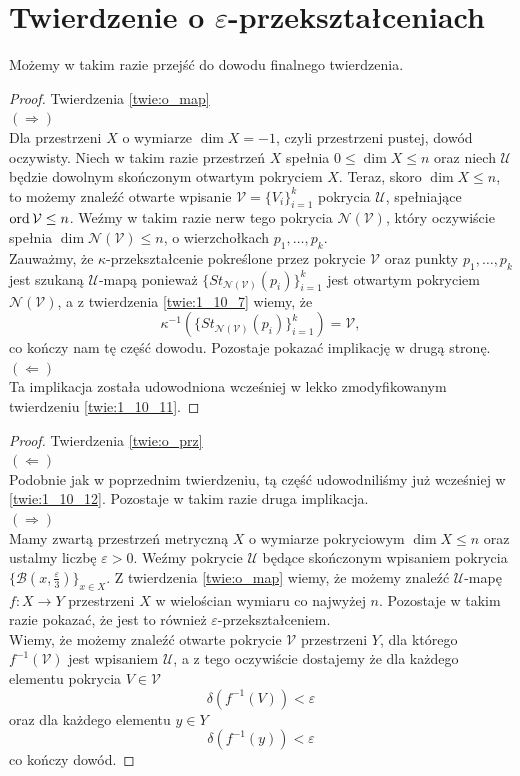 \section{Twierdzenie o $\varepsilon$-przekształceniach}
Możemy w takim razie przejść do dowodu finalnego twierdzenia.
\begin{proof}
    Twierdzenia \ref{twie:o_map}\\ 
    $(\Rightarrow)$\\
    Dla przestrzeni $X$ o wymiarze $\dim X = -1$, czyli przestrzeni pustej, dowód oczywisty. Niech w takim razie przestrzeń $X$ spełnia $0\le \dim X\le n$ oraz niech $\mathcal{U}$ będzie dowolnym skończonym otwartym pokryciem $X$. Teraz, skoro $\dim X\le n$, to możemy znaleźć otwarte wpisanie $\mathcal{V}=\{V_i\}_{i=1}^k$ pokrycia $\mathcal{U}$, spełniające $\operatorname{ord} \mathcal{V}\le n$. Weźmy w takim razie nerw tego pokrycia $\mathcal{N(V)}$, który oczywiście spełnia $\dim \mathcal{N(V)}\le n$, o wierzchołkach $p_1, \ldots, p_k$.\\
    Zauważmy, że $\kappa$-przekształcenie pokreślone przez pokrycie $\mathcal{V}$ oraz punkty $p_1, \ldots, p_k$ jest szukaną $\mathcal{U}$-mapą ponieważ 
    $\{St_{\mathcal{N(V)}}(p_i)\}_{i=1}^k$ jest otwartym pokryciem $\mathcal{N(V)}$, a z twierdzenia \ref{twie:1_10_7} wiemy, że 
    \[\kappa ^{-1}(\{St_{\mathcal{N(V)}}(p_i)\}_{i=1}^k)=\mathcal{V},\]
    co kończy nam tę część dowodu. Pozostaje pokazać implikację w drugą stronę.\\
    $(\Leftarrow)$\\
    Ta implikacja została udowodniona wcześniej w lekko zmodyfikowanym twierdzeniu \ref{twie:1_10_11}.
\end{proof}

\begin{proof} 
    Twierdzenia \ref{twie:o_prz}\\
    $(\Leftarrow)$\\
    Podobnie jak w poprzednim twierdzeniu, tą część udowodniliśmy już wcześniej w \ref{twie:1_10_12}. Pozostaje w takim razie druga implikacja.\\
    $(\Rightarrow)$\\
    Mamy zwartą przestrzeń metryczną $X$ o wymiarze pokryciowym $\dim X\le n$ oraz ustalmy liczbę $\varepsilon>0$. Weźmy pokrycie $\mathcal{U}$ będące skończonym wpisaniem pokrycia $\{ \mathcal{B}(x, \frac{\varepsilon}{3}) \}_{x\in X}$. Z twierdzenia \ref{twie:o_map} wiemy, że możemy znaleźć $\mathcal{U}$-mapę $f:X\rightarrow Y$  przestrzeni $X$ w wielościan wymiaru co najwyżej $n$. Pozostaje w takim razie pokazać, że jest to również $\varepsilon$-przekształceniem. \\
    Wiemy, że możemy znaleźć otwarte pokrycie $\mathcal{V}$ przestrzeni $Y$, dla którego $f^{-1}(\mathcal{V})$ jest wpisaniem $\mathcal{U}$, a z tego oczywiście dostajemy że dla każdego elementu pokrycia $V\in \mathcal{V}$ 
    \[\delta (f^{-1}(V))< \varepsilon\]
    oraz dla każdego elementu $y \in Y$
    \[\delta (f^{-1}(y))< \varepsilon\]
    co kończy dowód.    
\end{proof}

